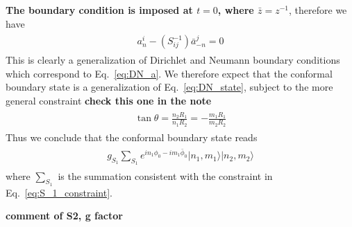{\bf\color{red}The boundary condition is imposed at $t=0$, where $\bar{z}=z^{-1}$}, therefore we have
\begin{eqnarray}\begin{aligned}
a^i_n-(S^{-1}_{ij})\bar{a}^j_{-n}=0
\end{aligned}\end{eqnarray}
This is clearly a generalization of Dirichlet and Neumann boundary conditions which correspond to Eq.~\eqref{eq:DN_a}. We therefore expect that the conformal boundary state is a generalization of Eq.~\eqref{eq:DN_state}, subject to the more general constraint {\bf\color{red}check this one in the note}
\begin{eqnarray}\begin{aligned}
\label{eq:S_1_constraint}
\tan\theta=\frac{n_2R_1}{n_1R_2}=-\frac{m_1R_1}{m_2R_2}
\end{aligned}\end{eqnarray}
Thus we conclude that the conformal boundary state reads
\begin{eqnarray}\begin{aligned}
g_{S_1}\sum_{S_1}e^{in_1\phi_0-im_1\bar{\phi}_0}|n_1,m_1\rangle|n_2,m_2\rangle
\end{aligned}\end{eqnarray}
where $\sum_{S_1}$ is the summation consistent with the constraint in Eq.~\eqref{eq:S_1_constraint}. 

{\bf\color{red}comment of S2, g factor}

